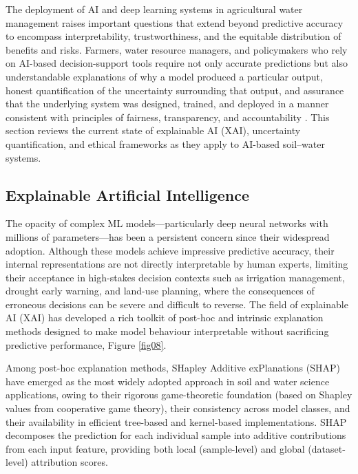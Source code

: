 \documentclass[land,article,submit,pdftex,moreauthors]{Definitions/mdpi}
\numberwithin{equation}{section}
\begin{document}
The deployment of AI and deep learning systems in agricultural water management raises important questions that extend beyond predictive accuracy to encompass interpretability, trustworthiness, and the equitable distribution of benefits and risks. Farmers, water resource managers, and policymakers who rely on AI-based decision-support tools require not only accurate predictions but also understandable explanations of why a model produced a particular output, honest quantification of the uncertainty surrounding that output, and assurance that the underlying system was designed, trained, and deployed in a manner consistent with principles of fairness, transparency, and accountability \citep{adadi2018peeking}. This section reviews the current state of explainable AI (XAI), uncertainty quantification, and ethical frameworks as they apply to AI-based soil--water systems.

\subsection{Explainable Artificial Intelligence}

The opacity of complex ML models---particularly deep neural networks with millions of parameters---has been a persistent concern since their widespread adoption. Although these models achieve impressive predictive accuracy, their internal representations are not directly interpretable by human experts, limiting their acceptance in high-stakes decision contexts such as irrigation management, drought early warning, and land-use planning, where the consequences of erroneous decisions can be severe and difficult to reverse. The field of explainable AI (XAI) has developed a rich toolkit of post-hoc and intrinsic explanation methods designed to make model behaviour interpretable without sacrificing predictive performance, Figure \ref{fig08}.

Among post-hoc explanation methods, SHapley Additive exPlanations (SHAP) \citep{lundberg2017unified} have emerged as the most widely adopted approach in soil and water science applications, owing to their rigorous game-theoretic foundation (based on Shapley values from cooperative game theory), their consistency across model classes, and their availability in efficient tree-based and kernel-based implementations. SHAP decomposes the prediction for each individual sample into additive contributions from each input feature, providing both local (sample-level) and global (dataset-level) attribution scores. 
\end{document}
